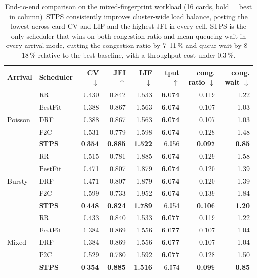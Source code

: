 \documentclass[letterpaper,twocolumn,10pt]{article}
\begin{document}
\begin{table}[!t]
\centering
\caption{End-to-end comparison on the mixed-fingerprint workload (16 cards, bold = best in column). 
STPS consistently improves cluster-wide load balance, posting the lowest across-card CV and LIF and the highest JFI in every cell. 
STPS is the only scheduler that wins on both congestion ratio and mean queueing wait in every arrival mode, 
cutting the congestion ratio by 7--11\,\% and queue wait by 8--18\,\% relative to the best baseline, 
with a throughput cost under 0.3\,\%.}
\label{tab:q0_main}
\footnotesize
\setlength{\tabcolsep}{5pt}
\begin{tabular}{llrrrrrr}
\toprule
Arrival & Scheduler & CV $\downarrow$ & JFI $\uparrow$ & LIF $\downarrow$ & tput $\uparrow$ & cong. ratio $\downarrow$ & cong. wait $\downarrow$ \\
\midrule
\multirow{5}{*}{Poisson}   & RR & 0.430 & 0.842 & 1.533 & \textbf{6.074} & 0.119 & 1.22 \\
 & BestFit & 0.388 & 0.867 & 1.563 & \textbf{6.074} & 0.107 & 1.03 \\
 & DRF & 0.388 & 0.867 & 1.563 & \textbf{6.074} & 0.107 & 1.03 \\
 & P2C & 0.531 & 0.779 & 1.598 & \textbf{6.074} & 0.128 & 1.48 \\
 & \textbf{STPS} & \textbf{0.354} & \textbf{0.885} & \textbf{1.522} & 6.056 & \textbf{0.097} & \textbf{0.85} \\
\midrule
\multirow{5}{*}{Bursty}   & RR & 0.515 & 0.781 & 1.885 & \textbf{6.074} & 0.129 & 1.58 \\
 & BestFit & 0.471 & 0.807 & 1.879 & \textbf{6.074} & 0.120 & 1.39 \\
 & DRF & 0.471 & 0.807 & 1.879 & \textbf{6.074} & 0.120 & 1.39 \\
 & P2C & 0.599 & 0.733 & 1.952 & \textbf{6.074} & 0.139 & 1.84 \\
 & \textbf{STPS} & \textbf{0.448} & \textbf{0.824} & \textbf{1.789} & 6.054 & \textbf{0.106} & \textbf{1.20} \\
\midrule
\multirow{5}{*}{Mixed}   & RR & 0.433 & 0.840 & 1.533 & \textbf{6.077} & 0.119 & 1.22 \\
 & BestFit & 0.384 & 0.869 & 1.556 & \textbf{6.077} & 0.107 & 1.04 \\
 & DRF & 0.384 & 0.869 & 1.556 & \textbf{6.077} & 0.107 & 1.04 \\
 & P2C & 0.529 & 0.780 & 1.592 & \textbf{6.077} & 0.128 & 1.50 \\
 & \textbf{STPS} & \textbf{0.354} & \textbf{0.885} & \textbf{1.516} & 6.074 & \textbf{0.099} & \textbf{0.85} \\
\bottomrule
\end{tabular}
\end{table}
\end{document}
